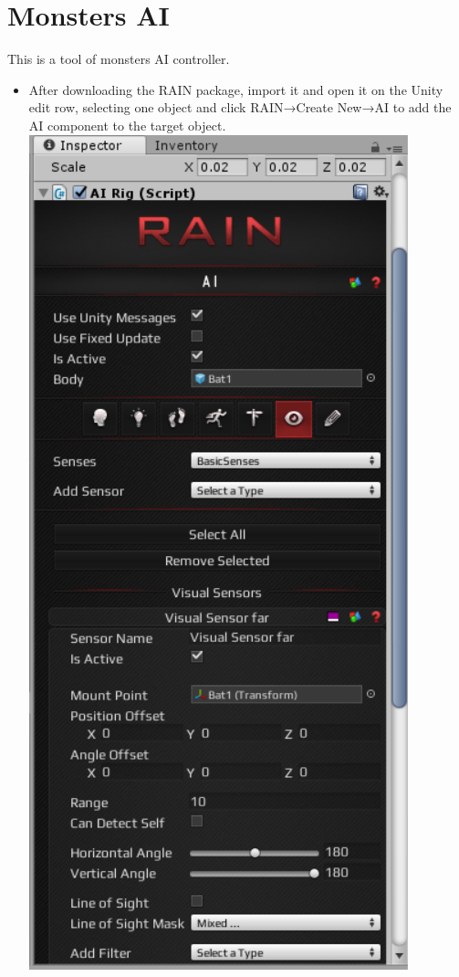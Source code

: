 \section{Monsters AI}
This is a tool of monsters AI controller.
\\
\begin{itemize}
\item After downloading the RAIN package, import it and open it on the Unity edit row, selecting one object and click RAIN→Create New→AI to add the AI component to the target object.  \\
\includegraphics[scale=0.5]{img/RainInspector.png}\\

\end{itemize}

